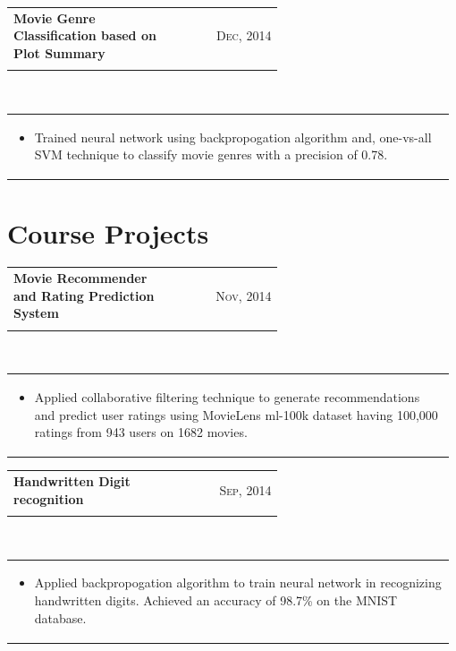 \documentclass[a4paper]{article} %
\newcommand{\verticalspacing}{-0.25cm}
\newcommand{\bulletspace}{0.7cm}
\newcommand{\projectheadspacing}{6.9cm}
\newcommand{\cproject}[5]{%
    \begin{tabular}{p{0.60\linewidth}r}
        \textcolor{smokyblack}{\small #2} & \multicolumn{1}{m{ \projectheadspacing{} }}{\raggedleft \small {\textsc{#1}}}\\
        \textcolor{payne\'sgrey}{\small #3} & \small {#4}
    \end{tabular}\\
    \begin{tabular}{p{0.98\linewidth}}
    \vspace{-0.3cm}
        \small{#5}
    \end{tabular}
    \vspace{\verticalspacing{}}
}
\begin{document}
\cproject
    {Dec, 2014}
    {\textbf{Movie Genre Classification based on Plot Summary}}
    {\textsc{\raggedright Minor Project}}
    {}
    {%
        \begin{itemize}[leftmargin=\bulletspace{}]
            \item Trained neural network  using backpropogation algorithm and, one-vs-all SVM technique to classify movie genres with a precision of 0.78.
        \end{itemize}
    }
    
\section{Course Projects}
\cproject
    {Nov, 2014}
    {\textbf{Movie Recommender and Rating Prediction System}}
    {\textsc{\raggedright Machine Learning Course}}
    {}
    {%
        \begin{itemize}[leftmargin=\bulletspace{}]
            \item Applied collaborative filtering technique to generate recommendations and predict user ratings using MovieLens ml-100k dataset having 100,000 ratings from 943 users on 1682 movies.
        \end{itemize}
    }
    
\cproject
    {Sep, 2014}
    {\textbf{Handwritten Digit recognition}}
    {\textsc{\raggedright Machine Learning Course}}
	{}
    {%
        \begin{itemize}[leftmargin=\bulletspace{}]
            \item Applied backpropogation algorithm to train neural network in recognizing handwritten digits. Achieved an accuracy of 98.7\% on the MNIST database.
        \end{itemize}
    }



\end{document}
